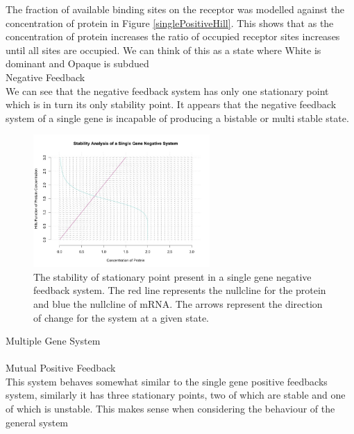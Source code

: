 \documentclass[]{article}
\begin{document}
            The fraction of available binding sites on the receptor was modelled against the concentration of protein in Figure \ref{singlePositiveHill}. This shows that as the concentration of protein increases the ratio of occupied receptor sites increases until all sites are occupied. We can think of this as a state where %
            White is dominant and Opaque is subdued %
\\
Negative Feedback\\
We can see that the negative feedback system has only one stationary point which is in turn its only stability point. It appears that the negative feedback system of a single gene is incapable of producing a bistable or multi stable state.  
            \begin{figure}[h!]
            \centering
            \includegraphics[width=0.6\textwidth]{./figures/stabilitySingleNegative.jpeg}
            \caption{The stability of stationary point present in a single gene negative feedback system. The red line represents the nullcline for the protein and blue the nullcline of mRNA. The arrows represent the direction of change for the system at a given state.}
            \label{stabilitySingleNegative}
            \end{figure}
Multiple Gene System\\
\\
Mutual Positive Feedback\\
 This system behaves somewhat similar to the single gene positive feedbacks system, similarly it has three stationary points, two of which are stable and one of  which is unstable. This makes sense when considering the behaviour of the general system %
\end{document}
